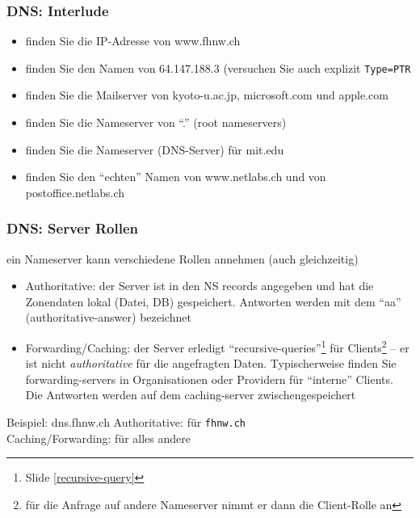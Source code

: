 \documentclass[ignorenonframetext]{beamer}
\begin{document}
\begin{frame}
\frametitle{DNS: Interlude}
\begin{itemize}
  \item{finden Sie die IP-Adresse von www.fhnw.ch}
  \item{finden Sie den Namen von 64.147.188.3 (versuchen Sie auch explizit \texttt{Type=PTR}}
  \item{finden Sie die Mailserver von kyoto-u.ac.jp, microsoft.com und apple.com}
	\item{finden Sie die Nameserver von ``.'' (root nameservers)}
	\item{finden Sie die Nameserver (DNS-Server) f\"ur mit.edu}
	\item{finden Sie den ``echten'' Namen von www.netlabs.ch und von postoffice.netlabs.ch}
\end{itemize}
\end{frame}


\begin{frame}
\frametitle{DNS: Server Rollen}
ein Nameserver kann verschiedene Rollen annehmen (auch gleichzeitig)
\begin{itemize}
	\item{Authoritative: der Server ist in den NS records angegeben und hat die Zonendaten lokal (Datei, DB) gespeichert. Antworten werden mit dem ``aa'' (authoritative-answer) bezeichnet}
	\item{Forwarding/Caching: der Server erledigt ``recursive-queries''\footnote{Slide \ref{recursive-query}} f\"ur Clients\footnote{f\"ur die Anfrage auf andere Nameserver nimmt er dann die Client-Rolle an} -- er ist nicht {\em authoritative} f\"ur die angefragten Daten. Typischerweise finden Sie forwarding-servers in Organisationen oder Providern f\"ur ``interne'' Clients}. Die Antworten werden auf dem caching-server zwischengespeichert
\end{itemize}
\begin{block}{Beispiel: dns.fhnw.ch}
Authoritative: f\"ur \texttt{fhnw.ch}\\
Caching/Forwarding: f\"ur alles andere
\end{block}
\end{frame}
\end{document}
